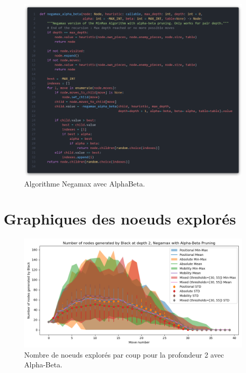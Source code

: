 \begin{figure}[H]
    \centering
    \includegraphics[width=1\textwidth]{ressources/nega-a-b.png}
    \caption{Algorithme Negamax avec AlphaBeta.}
    \label{fig:negamax-a-b}
\end{figure}

\section{Graphiques des noeuds explorés}
\label{app:node_explored}

\begin{figure}[H]
    \centering
    \includegraphics[width=1\textwidth]{ressources/Number of nodes generated by Black_depth_2_Negamax with Alpha-Beta Pruning.png}
    \caption{Nombre de noeuds explorés par coup pour la profondeur 2 avec Alpha-Beta.}
    \label{fig:node_explored_alpha_beta}
\end{figure}


